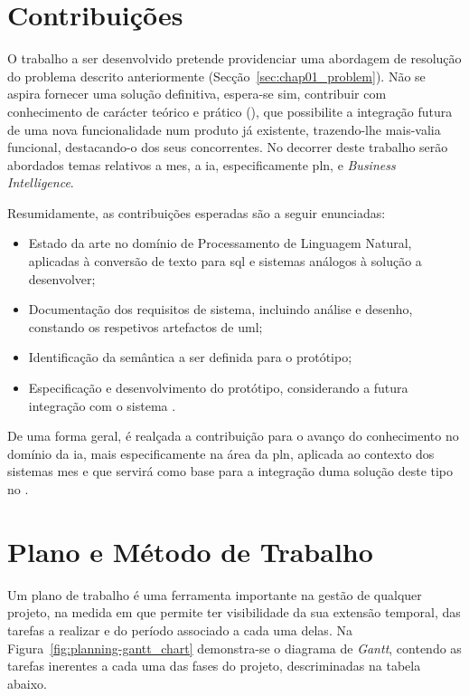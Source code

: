 \section{Contribuições}
\label{sec:chap01_contributions}
O trabalho a ser desenvolvido pretende providenciar uma abordagem de resolução do problema descrito anteriormente (Secção~\ref{sec:chap01_problem}). Não se aspira fornecer uma solução definitiva, espera-se sim, contribuir com conhecimento de carácter teórico e prático (), que possibilite a integração futura de uma nova funcionalidade num produto já existente, trazendo-lhe mais-valia funcional, destacando-o dos seus concorrentes. No decorrer deste trabalho serão abordados temas relativos a \gls{mes}, a \gls{ia}, especificamente \gls{pln}, e \textit{Business Intelligence}.

Resumidamente, as contribuições esperadas são a seguir enunciadas:

\begin{itemize}
    \item
    {
        Estado da arte no domínio de Processamento de Linguagem Natural, aplicadas à conversão de texto para \gls{sql} e sistemas análogos à solução a desenvolver;
    }
    \item 
    {
        Documentação dos requisitos de sistema, incluindo análise e desenho, constando os respetivos artefactos de \gls{uml};
    }
    \item 
    {
        Identificação da semântica a ser definida para o protótipo;
    }
    \item
    {
        Especificação e desenvolvimento do protótipo, considerando a futura integração com o sistema {\productname}.
    }
\end{itemize}

De uma forma geral, é realçada a contribuição para o avanço do conhecimento no domínio da \gls{ia}, mais especificamente na área da \gls{pln}, aplicada ao contexto dos sistemas \gls{mes} e que servirá como base para a integração duma solução deste tipo no {\productname}.

\section{Plano e Método de Trabalho}
\label{sec:chap01_workmethodology}
Um plano de trabalho é uma ferramenta importante na gestão de qualquer projeto, na medida em que permite ter visibilidade da sua extensão temporal, das tarefas a realizar e do período associado a cada uma delas. Na Figura~\ref{fig:planning-gantt_chart} demonstra-se o diagrama de \textit{Gantt}, contendo as tarefas inerentes a cada uma das fases do projeto, descriminadas na tabela abaixo.


